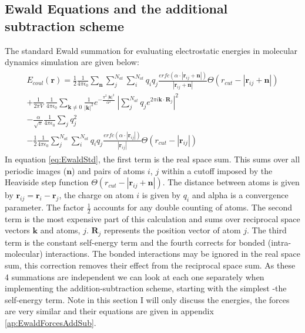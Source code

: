 \subsection{Ewald Equations and the additional subtraction scheme}
The standard Ewald summation for evaluating electrostatic energies in molecular dynamics simulation are given below:
\begin{align}
  \begin{split}
E_{coul}\left(\mathbf{r}\right)
=
\frac{1}{2}\frac{1}{4 \pi \epsilon_0} \sum_{\mathbf{n}} \sum_{j}^{N_{at}} \sum_{i}^{N_{at}} q_i q_j \frac{erfc\left( \alpha \cdot |\mathbf{r}_{ij} + \mathbf{n}|\right)}{|\mathbf{r}_{ij} + \mathbf{n}|} \Theta\left( r_{cut} - |\mathbf{r}_{ij} + \mathbf{n}| \right)
\\
+
\frac{1}{2\pi V} \ \frac{1}{4 \pi \epsilon_0} \sum_{\mathbf{k} \neq 0} \frac{1}{|\mathbf{k}|^2} e^{-\frac{\pi^2 \ |\mathbf{k}|^2}{\alpha^2}} \ \left|\sum_{j}^{N_{at}} q_{j} e^{2\pi i \mathbf{k} \cdot \mathbf{R}_{j}}\right|^2 \\
- \frac{\alpha}{\sqrt{\pi}} \frac{1}{4 \pi \epsilon_{0}} \sum_{j} q_{j}^2
\\
- \frac{1}{2} \frac{1}{4 \pi \epsilon_0} \sum_{j}^{N_{at}} \sum_{i}^{N_{at}} q_i q_j \frac{erfc\left( \alpha \cdot |\mathbf{r}_{ij}|\right)}{|\mathbf{r}_{ij}|} \Theta\left( r_{cut} - |\mathbf{r}_{ij}| \right) 
	\end{split}
\label{eq:EwaldStd}
\end{align}
In equation \eqref{eq:EwaldStd}, the first term is the real space sum. This sums over all periodic images ($\mathbf{n}$) and pairs of atoms $i$, $j$ within a cutoff imposed by the Heaviside step function $\Theta(r_{cut} - |\mathbf{r}_{ij}+\mathbf{n}|)$. The distance between atoms is given by $\mathbf{r}_{ij} = \mathbf{r}_{i} - \mathbf{r}_{j}$, the charge on atom $i$ is given by $q_{i}$ and alpha is a convergence parameter. The factor $\frac{1}{2}$ accounts for any double counting of atoms. The second term is the most expensive part of this calculation and sums over reciprocal space vectors $\mathbf{k}$ and atoms, $j$. $\mathbf{R}_{j}$ represents the position vector of atom $j$. The third term is the constant self-energy term and the fourth corrects for bonded  (intra-molecular) interactions. The bonded interactions may be ignored in the real space sum, this correction removes their effect from the reciprocal space sum. As these 4 summations are independent we can look at each one separately when implementing the addition-subtraction scheme, starting with the simplest -the self-energy term. Note in this section I will only discuss the energies, the forces are very similar and their equations are given in appendix \ref{ap:EwaldForcesAddSub}.
